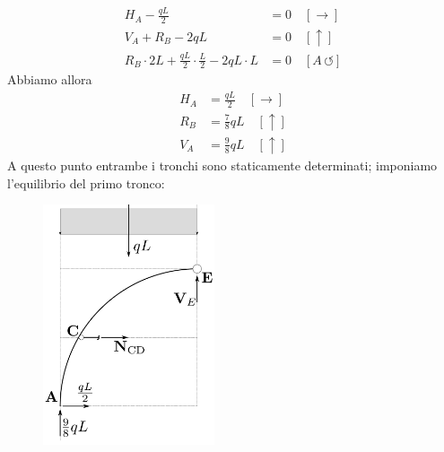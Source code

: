 \begin{subequations}
\begin{align}
H_{A} - \frac{qL}{2} &= 0 \quad [\rightarrow] \label{equazione11-1-1a} \tag{11.1.1a} \\
V_{A} + R_{B} - 2qL &= 0 \quad [\uparrow] \label{equazione11-1-1b} \tag{11.1.1b} \\ 
R_{B}\cdot 2L + \frac{qL}{2} \cdot \frac{L}{2} -2qL\cdot L &= 0 \quad [A\, \circlearrowleft] \label{equazione11-1-1c} \tag{11.1.1c}
\end{align}
\end{subequations}
Abbiamo allora
\begin{subequations}
\begin{align}
H_{A} &= \frac{qL}{2} \quad [\rightarrow] \label{equazione11-1-2a} \tag{11.1.2a} \\
R_{B} &= \frac{7}{8}qL \quad [\uparrow] \label{equazione11-1-2b} \tag{11.1.2b} \\ 
V_{A} &= \frac{9}{8}qL \quad [\uparrow] \label{equazione11-1-2c} \tag{11.1.2c}
\end{align}
\end{subequations}
A questo punto entrambe i tronchi sono staticamente determinati; imponiamo l'equilibrio del primo tronco:
\renewcommand{\thefigure}{11.1~-~3}
\begin{figure}[ht]
\centering
\includegraphics[width=0.45\textwidth]{Immagini/Parte_11/Esercizio11_1_1/esercizio11_1_3.pdf}
\caption{}
\label{Esercizio11-1-3}
\end{figure}
